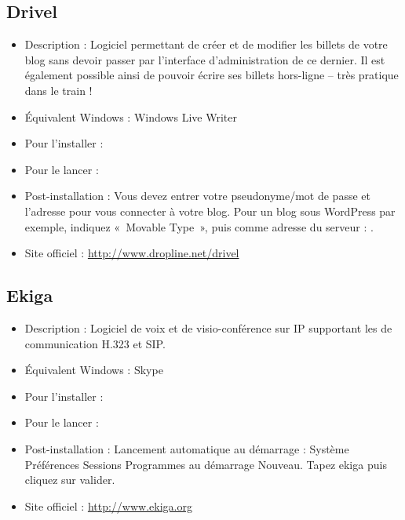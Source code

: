 \subsection{Drivel}
\begin{itemize}
\begingroup
{}
\item Description : Logiciel permettant de créer et de modifier les billets de votre blog sans devoir passer par l'interface d'administration de ce dernier. Il est également possible ainsi de pouvoir écrire ses billets hors-ligne -- très pratique dans le train !{\par}
\endgroup
\item Équivalent Windows : Windows Live Writer{\par}
\item Pour l'installer : 
\item Pour le lancer : 
\item Post-installation : Vous devez entrer votre pseudonyme/mot de passe et l'adresse pour vous connecter à votre blog. Pour un blog sous WordPress par exemple, indiquez «~Movable Type~», puis comme adresse du serveur : .{\par}
\item Site officiel : \url{http://www.dropline.net/drivel}{\par}
\end{itemize}

\subsection{Ekiga}
\begin{itemize}
\begingroup
{}
\item Description : Logiciel de voix et de visio-conférence sur IP supportant les  de communication H.323 et SIP.{\par}
\item Équivalent Windows : Skype{\par}
\item Pour l'installer : 
\item Pour le lancer : 
\item Post-installation : Lancement automatique au démarrage : Système \FlecheDroite  Préférences \FlecheDroite Sessions \FlecheDroite Programmes au démarrage \FlecheDroite Nouveau. Tapez ekiga puis cliquez sur valider.{\par}
\item Site officiel : \url{http://www.ekiga.org}{\par}
\endgroup
\end{itemize}
\newpage
